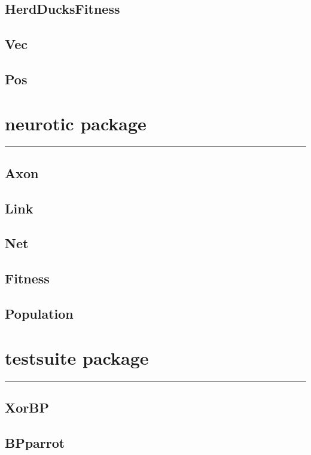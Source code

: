 \documentclass[a4paper]{report}
\newcommand{\code}[1]{{\ttfamily #1}}
\begin{document}
{\begin{multicols}{2}
  \subsection{HerdDucksFitness}
  \label{code-fit-herd}
  \subsection{Vec}
  \subsection{Pos}
\end{multicols}
\pagebreak[1]
\section{\code{neurotic} package}
\rule{\linewidth}{0.3pt}
\begin{multicols}{2}
  \subsection{Axon}
  \subsection{Link}
  \subsection{Net}
  \subsection{Fitness}
  \subsection{Population}
\end{multicols}
\section{\code{testsuite} package}
\rule{\linewidth}{0.3pt}
\begin{multicols}{2}
  \subsection{XorBP}
  \label{prog-test-bpxor}
  \subsection{BPparrot}
  \label{prog-test-bpparrot}
\end{multicols}
\pagebreak}

 \nocite{*} 
\end{document}
